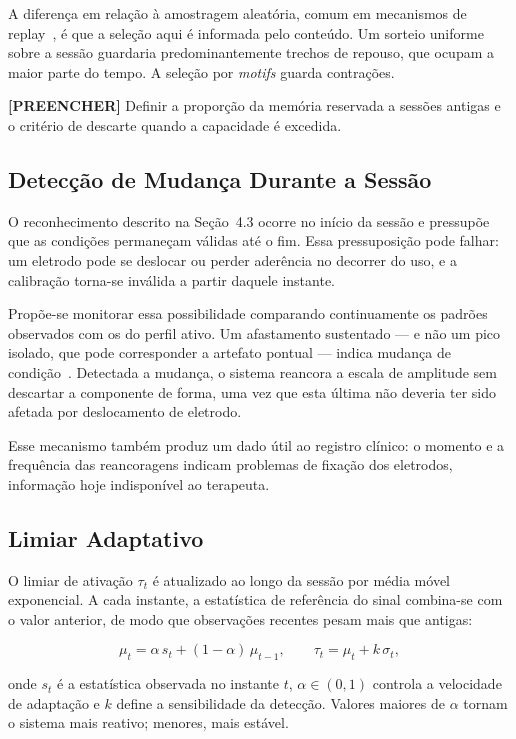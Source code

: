 A diferença em relação à amostragem aleatória, comum em mecanismos de
replay~\cite{ref:replay_memoria}, é que a seleção aqui é informada pelo
conteúdo. Um sorteio uniforme sobre a sessão guardaria
predominantemente trechos de repouso, que ocupam a maior parte do
tempo. A seleção por \textit{motifs} guarda contrações.

\textbf{[PREENCHER]} Definir a proporção da memória reservada a sessões
antigas e o critério de descarte quando a capacidade é excedida.

\subsection{Detecção de Mudança Durante a Sessão}

O reconhecimento descrito na Seção~4.3 ocorre no início da sessão e
pressupõe que as condições permaneçam válidas até o fim. Essa
pressuposição pode falhar: um eletrodo pode se deslocar ou perder
aderência no decorrer do uso, e a calibração torna-se inválida a partir
daquele instante.

Propõe-se monitorar essa possibilidade comparando continuamente os
padrões observados com os do perfil ativo. Um afastamento sustentado
--- e não um pico isolado, que pode corresponder a artefato pontual ---
indica mudança de condição~\cite{ref:deteccao_drift}. Detectada a
mudança, o sistema reancora a escala de amplitude sem descartar a
componente de forma, uma vez que esta última não deveria ter sido
afetada por deslocamento de eletrodo.

Esse mecanismo também produz um dado útil ao registro clínico: o
momento e a frequência das reancoragens indicam problemas de fixação
dos eletrodos, informação hoje indisponível ao terapeuta.

\subsection{Limiar Adaptativo}

O limiar de ativação $\tau_t$ é atualizado ao longo da sessão por média
móvel exponencial. A cada instante, a estatística de referência do
sinal combina-se com o valor anterior, de modo que observações recentes
pesam mais que antigas:

\begin{equation}
\mu_t = \alpha\, s_t + (1-\alpha)\,\mu_{t-1},
\qquad
\tau_t = \mu_t + k\,\sigma_t,
\end{equation}

\noindent onde $s_t$ é a estatística observada no instante $t$,
$\alpha \in (0,1)$ controla a velocidade de adaptação e $k$ define a
sensibilidade da detecção. Valores maiores de $\alpha$ tornam o sistema
mais reativo; menores, mais estável.

